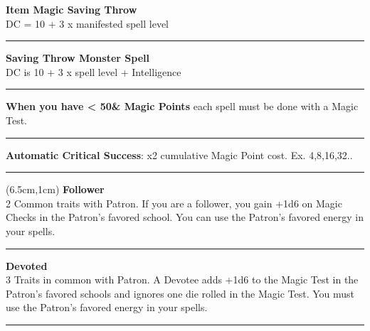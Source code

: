 \documentclass[a4paper,12 pt,openany]{book}
\newcommand{\linex}{\rule{\textwidth}{0.4pt}}
\begin{document}
\begin{textblock*}{5cm}
\textbf{Item Magic Saving Throw}\\
DC = 10 + 3 x manifested spell level

\linex

\textbf{Saving Throw Monster Spell}\\
DC is 10 + 3 x spell level + Intelligence

\linex

\textbf{When you have < 50\& Magic Points} each spell must be done with a Magic Test.

\linex

\textbf{Automatic Critical Success}: x2 cumulative Magic Point cost. Ex. 4,8,16,32..

\linex

\end{textblock*}


\begin{textblock*}{13.5cm}(6.5cm,1cm) %
\textbf{Follower}\\
2 Common traits with Patron. If you are a follower, you gain +1d6 on Magic Checks in the Patron's favored school. You can use the Patron's favored energy in your spells.\\

\linex

\textbf{Devoted}\\
3 Traits in common with Patron. A Devotee adds +1d6 to the Magic Test in the Patron's favored schools and ignores one die rolled in the Magic Test. You must use the Patron's favored energy in your spells.

\linex


\end{textblock*}
\end{document}

